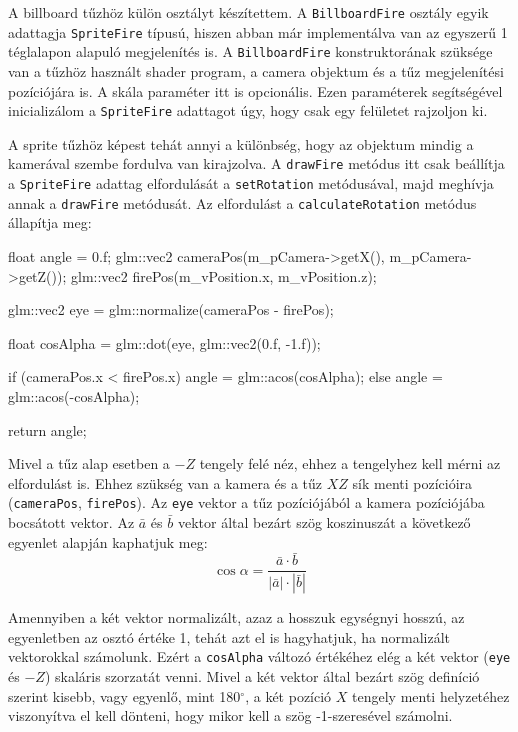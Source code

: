 A billboard tűzhöz külön osztályt készítettem. A \texttt{BillboardFire} osztály egyik adattagja \texttt{SpriteFire} típusú, hiszen abban már implementálva van az egyszerű 1 téglalapon alapuló megjelenítés is. A \texttt{BillboardFire} konstruktorának szüksége van a tűzhöz használt shader program, a camera objektum és a tűz megjelenítési pozíciójára is. A skála paraméter itt is opcionális. Ezen paraméterek segítségével inicializálom a \texttt{SpriteFire} adattagot úgy, hogy csak egy felületet rajzoljon ki. 

A sprite tűzhöz képest tehát annyi a különbség, hogy az objektum mindig a kamerával szembe fordulva van kirajzolva. A \texttt{drawFire} metódus itt csak beállítja a \texttt{SpriteFire} adattag elfordulását a \texttt{setRotation} metódusával, majd meghívja annak a \texttt{drawFire} metódusát. Az elfordulást a \texttt{calculateRotation} metódus állapítja meg:
\begin{cpp}
float angle = 0.f;
glm::vec2 cameraPos(m_pCamera->getX(), m_pCamera->getZ());
glm::vec2 firePos(m_vPosition.x, m_vPosition.z);

glm::vec2 eye = glm::normalize(cameraPos - firePos);

float cosAlpha = glm::dot(eye, glm::vec2(0.f, -1.f)); 

if (cameraPos.x < firePos.x)
{
	angle = glm::acos(cosAlpha);
}
else
{
	angle = glm::acos(-cosAlpha);
}

return angle;
\end{cpp}
Mivel a tűz alap esetben a $-Z$ tengely felé néz, ehhez a tengelyhez kell mérni az elfordulást is. Ehhez szükség van a kamera és a tűz $XZ$ sík menti pozícióira (\texttt{cameraPos}, \texttt{firePos}). Az \texttt{eye} vektor a tűz pozíciójából a kamera pozíciójába bocsátott vektor. Az $\bar{a}$ és $\bar{b}$ vektor által bezárt szög koszinuszát a következő egyenlet alapján kaphatjuk meg: 
$$
\cos \alpha = \frac{\bar{a} \cdot \bar{b}}{|\bar{a}| \cdot |\bar{b}|}
$$

Amennyiben a két vektor normalizált, azaz a hosszuk egységnyi hosszú, az egyenletben az osztó értéke 1, tehát azt el is hagyhatjuk, ha normalizált vektorokkal számolunk. Ezért a \texttt{cosAlpha} változó értékéhez elég a két vektor (\texttt{eye} és $-Z$) skaláris szorzatát venni. Mivel a két vektor által bezárt szög definíció szerint kisebb, vagy egyenlő, mint 180$^{\circ}$, a két pozíció $X$ tengely menti helyzetéhez viszonyítva el kell dönteni, hogy mikor kell a szög -1-szeresével számolni. 

